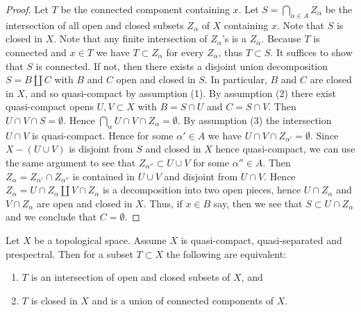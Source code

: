 \begin{proof}
    \leanok
  Let $T$ be the connected component containing $x$. Let $S = \bigcap_{\alpha \in A} Z_\alpha$ be the intersection of all open and closed subsets $Z_\alpha$ of $X$ containing $x$. Note that $S$ is closed in $X$. Note that any finite intersection of $Z_\alpha$'s is a $Z_\alpha$. Because $T$ is connected and $x \in T$ we have $T \subset Z_\alpha$ for every \(Z_\alpha\), thus \(T \subset S\). It suffices to show that $S$ is connected. If not, then there exists a disjoint union decomposition $S = B \amalg C$ with $B$ and $C$ open and closed in $S$. In particular, $B$ and $C$ are closed in $X$, and so quasi-compact by assumption (1). By assumption (2) there exist quasi-compact opens $U, V \subset X$ with $B = S \cap U$ and $C = S \cap V$. Then $U \cap V \cap S = \emptyset$. Hence $\bigcap_\alpha U \cap V \cap Z_\alpha = \emptyset$. By assumption (3) the intersection $U \cap V$ is quasi-compact. Hence for some $\alpha' \in A$ we have $U \cap V \cap Z_{\alpha'} = \emptyset$. Since $X - (U \cup V)$ is disjoint from $S$ and closed in $X$ hence quasi-compact, we can use the same argument to see that $Z_{\alpha''} \subset U \cup V$ for some $\alpha'' \in A$. Then $Z_\alpha = Z_{\alpha'} \cap Z_{\alpha''}$ is contained in $U \cup V$ and disjoint from $U \cap V$. Hence $Z_\alpha = U \cap Z_\alpha \amalg V \cap Z_\alpha$ is a decomposition into two open pieces, hence $U \cap Z_\alpha$ and $V \cap Z_\alpha$ are open and closed in $X$. Thus, if $x \in B$ say, then we see that $S \subset U \cap Z_\alpha$ and we conclude that $C = \emptyset$.
\end{proof}

\begin{lemma}
  \label{thm:intersection-closed-open-iff}
  \leanok
  Let $X$ be a topological space. Assume $X$ is quasi-compact, quasi-separated
  and prespectral. Then for a subset $T \subset X$ the following are equivalent:
  \begin{enumerate}
    \item $T$ is an intersection of open and closed subsets of $X$, and
    \item $T$ is closed in $X$ and is a union of connected components of $X$.
  \end{enumerate}
\end{lemma}

